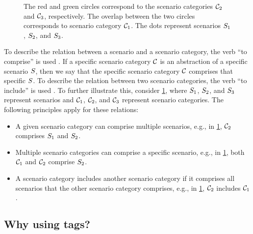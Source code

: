 \setlength{\venncircle}{5em}
\begin{figure}[t]
	\centering
	
	\caption{The red and green circles correspond to the scenario categories $\mathcal{C}_{2}$ and $\mathcal{C}_{3}$, respectively. The overlap between the two circles corresponds to scenario category $\mathcal{C}_{1}$. The dots represent scenarios $S_{1}$, $S_{2}$, and $S_{3}$.}
	\label{fig:venn diagram scenario category}
\end{figure}

To describe the relation between a scenario and a scenario category, the verb ``to comprise'' is used \autocite{degelder2020ontology}.
If a specific scenario category $\mathcal{C}$ is an abstraction of a specific scenario $S$, then we say that the specific scenario category $\mathcal{C}$ comprises that specific $S$. 
To describe the relation between two scenario categories, the verb ``to include'' is used \autocite{degelder2020ontology}. 
To further illustrate this, consider \cref{fig:venn diagram scenario category}, where $S_{1}$, $S_{2}$, and $S_{3}$ represent scenarios and $\mathcal{C}_{1}$, $\mathcal{C}_{2}$, and $\mathcal{C}_{3}$ represent scenario categories.
The following principles apply for these relations:
\begin{itemize}
	\item A given scenario category can comprise multiple scenarios, e.g., in \cref{fig:venn diagram scenario category}, $\mathcal{C}_{2}$ comprises $S_{1}$ and $S_{2}$.
	\item Multiple scenario categories can comprise a specific scenario, e.g., in \cref{fig:venn diagram scenario category}, both $\mathcal{C}_{1}$ and $\mathcal{C}_{2}$ comprise $S_{2}$. 
	\item A scenario category includes another scenario category if it comprises all scenarios that the other scenario category comprises, e.g., in \cref{fig:venn diagram scenario category}, $\mathcal{C}_{2}$ includes $\mathcal{C}_{1}$.
\end{itemize}



\subsection{Why using tags?}
\label{sec:tags for scenario catgories}

